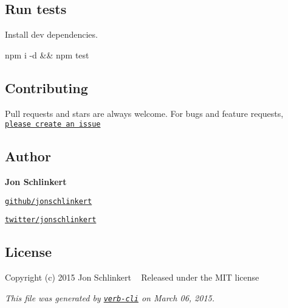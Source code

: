 \subsection*{Run tests}

Install dev dependencies.


\begin{DoxyCode}
npm i -d && npm test
\end{DoxyCode}


\subsection*{Contributing}

Pull requests and stars are always welcome. For bugs and feature requests, \href{https://github.com/jonschlinkert/is-extglob/issues}{\tt please create an issue}

\subsection*{Author}

{\bfseries Jon Schlinkert}


\begin{DoxyItemize}
\item \href{https://github.com/jonschlinkert}{\tt github/jonschlinkert}
\item \href{http://twitter.com/jonschlinkert}{\tt twitter/jonschlinkert}
\end{DoxyItemize}

\subsection*{License}

Copyright (c) 2015 Jon Schlinkert ~\newline
Released under the M\+IT license





{\itshape This file was generated by \href{https://github.com/assemble/verb-cli}{\tt verb-\/cli} on March 06, 2015.} 
